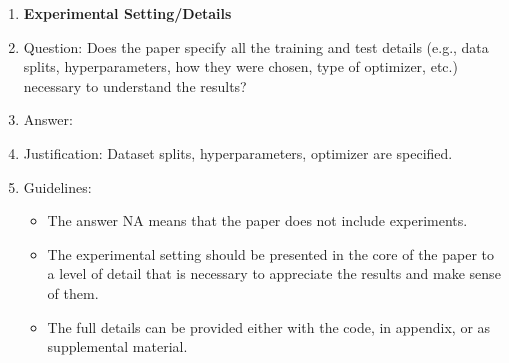 \documentclass{article}
\begin{document}
\begin{enumerate}
\item {\bf Experimental Setting/Details}
    \item[] Question: Does the paper specify all the training and test details (e.g., data splits, hyperparameters, how they were chosen, type of optimizer, etc.) necessary to understand the results?
    \item[] Answer: \answerYes{} %
    \item[] Justification: Dataset splits, hyperparameters, optimizer are specified.
    \item[] Guidelines:
    \begin{itemize}
        \item The answer NA means that the paper does not include experiments.
        \item The experimental setting should be presented in the core of the paper to a level of detail that is necessary to appreciate the results and make sense of them.
        \item The full details can be provided either with the code, in appendix, or as supplemental material.
    \end{itemize}


\end{enumerate}
\end{document}

